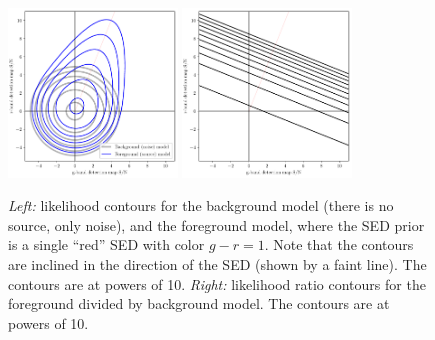 \documentclass[letterpaper,preprint]{aastex62}
\begin{document}

\begin{figure}
    \begin{center}
    \includegraphics[width=0.4\textwidth]{prob-contours-a}
    \includegraphics[width=0.4\textwidth]{prob-rel-a}
    \caption{ \emph{Left:} likelihood contours for the background
      model (there is no source, only noise), and the foreground
      model, where the SED prior is a single ``red'' SED with color $g
      - r = 1$.  Note that the contours are inclined in the direction
      of the SED (shown by a faint line).  The contours are at powers
      of 10.  \emph{Right:} likelihood ratio contours for the
      foreground divided by background model.  The contours are at
      powers of 10.
      \label{fig:cona}
    }
    \end{center}
\end{figure}
\end{document}
